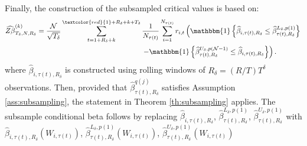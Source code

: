 Finally, the construction of the subsampled critical values is based on:
\begin{align}
    \widehat{Z \beta}_{T_\delta,N,R_\delta}^{(k)} &= \frac{\mathcal{N}}{\sqrt{T_\delta}} \sum_{t=1+R_\delta+k}^{\textcolor{red}{1}+R_\delta+k+T_\delta}\frac{1}{N_{\tau(t)}}\sum_{i=1}^{N_{\tau(t)}}r_{i,t}\left( \mathbbm{1}\left\{ \widehat{\beta}_{i,\tau(t),R_\delta}\leq \widehat{\beta}_{\tau(t) ,R_\delta}^{L_\delta, p(1)}\right\} \right. \\
    & \hspace{5.2cm}\left.- \mathbbm{1}\left\{ \widehat{\beta}_{\tau(t), R_\delta}^{U_\delta, p(\mathcal{N}-1)} \leq \widehat{\beta}_{i,\tau(t), R_\delta} \right\} \right). \notag
\end{align}
where $\widehat{\beta}_{i,\tau(t), R_\delta}$ is constructed using rolling windows of $R_\delta = (R/T)T^\delta$ observations. Then, provided that $\widehat{\beta}^{q(j)}_{\tau(t), R_\delta}$ satisfies Assumption \ref{ass:subsampling}, the statement in Theorem \ref{th:subsampling} applies. The subsample conditional beta follows by replacing $\widehat{\beta}_{i,\tau(t), R_\delta}$, $\widehat{\beta}^{L_\delta,p(1)}_{\tau(t),R_\delta}$, $\widehat{\beta}^{U_\delta,p(1)}_{\tau(t),R_\delta}$ with $\widehat{\beta}_{i,\tau(t), R_\delta} (W_{i,\tau(t)})$, $\widehat{\beta}^{L_\delta,p(1)}_{\tau(t),R_\delta} (W_{i,\tau(t)})$, $\widehat{\beta}^{U_\delta,p(1)}_{\tau(t),R_\delta} (W_{i,\tau(t)})$
